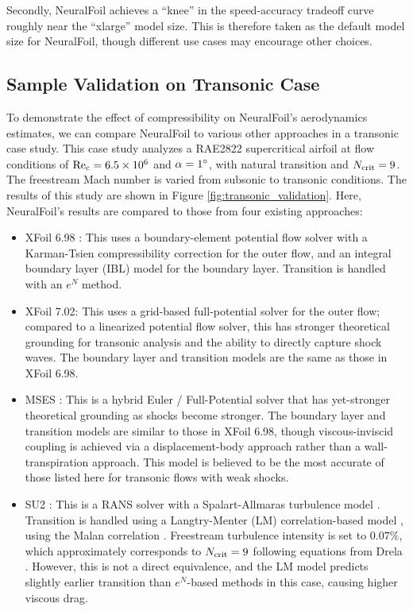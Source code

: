 \documentclass[journal]{new-aiaa}
\begin{document}
Secondly, NeuralFoil achieves a ``knee'' in the speed-accuracy tradeoff curve roughly near the ``xlarge'' model size. This is therefore taken as the default model size for NeuralFoil, though different use cases may encourage other choices.

\subsection{Sample Validation on Transonic Case}
\label{sec:validation_transonic}

To demonstrate the effect of compressibility on NeuralFoil's aerodynamics estimates, we can compare NeuralFoil to various other approaches in a transonic case study. This case study analyzes a RAE2822 supercritical airfoil at flow conditions of $\rm Re_c=6.5 \times 10^6$ and $\alpha=1\degree$, with natural transition and $N_{\rm crit}=9$. The freestream Mach number is varied from subsonic to transonic conditions. The results of this study are shown in Figure \ref{fig:transonic_validation}. Here, NeuralFoil's results are compared to those from four existing approaches:

\begin{itemize}
    \item XFoil 6.98 \cite{drelaXFOILAnalysisDesign1989}: This uses a boundary-element potential flow solver with a Karman-Tsien compressibility correction for the outer flow, and an integral boundary layer (IBL) model for the boundary layer. Transition is handled with an $e^N$ method.
    \item XFoil 7.02: This uses a grid-based full-potential solver for the outer flow; compared to a linearized potential flow solver, this has stronger theoretical grounding for transonic analysis and the ability to directly capture shock waves. The boundary layer and transition models are the same as those in XFoil 6.98.
    \item MSES \cite{drelaUsersGuideMSES2007}: This is a hybrid Euler / Full-Potential solver that has yet-stronger theoretical grounding as shocks become stronger. The boundary layer and transition models are similar to those in XFoil 6.98, though viscous-inviscid coupling is achieved via a displacement-body approach rather than a wall-transpiration approach. This model is believed to be the most accurate of those listed here for transonic flows with weak shocks.
    \item SU2 \cite{economonSU2OpenSourceSuite2016}: This is a RANS solver with a Spalart-Allmaras turbulence model \cite{spalartOneequationTurbulenceModel1992}. Transition is handled using a Langtry-Menter (LM) correlation-based model \cite{menterCorrelationBasedTransitionModel2006}, using the Malan correlation \cite{menterOneEquationLocalCorrelationBased2015}. Freestream turbulence intensity is set to $0.07\%$, which approximately corresponds to $N_{\rm crit}=9$ following equations from Drela \cite{drelaFlightVehicleAerodynamics2013}. However, this is not a direct equivalence, and the LM model predicts slightly earlier transition than $e^{N}$-based methods in this case, causing higher viscous drag.
\end{itemize}
\end{document}
